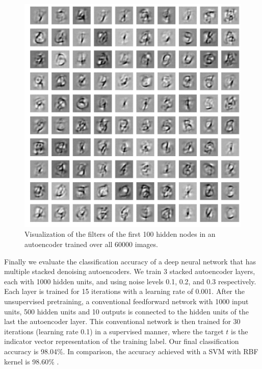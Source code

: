 \documentclass[conference]{IEEEtran}
\begin{document}
\begin{figure}[h]
\centering
\includegraphics[width=0.8\linewidth]{experiment3_1.png}
\caption{Visualization of the filters of the first 100 hidden nodes in an autoencoder trained over all 60000 images.}
\label{fig:experiment3_1}
\end{figure}

Finally we evaluate the classification accuracy of a deep neural network that has multiple stacked denoising autoencoders. We train 3 stacked autoencoder layers, each with 1000 hidden units, and using noise levels 0.1, 0.2, and 0.3 respectively. Each layer is trained for 15 iterations with a learning rate of 0.001. After the unsupervised pretraining, a conventional feedforward network with 1000 input units, 500 hidden units and 10 outputs is connected to the hidden units of the last the autoencoder layer. This conventional network is then trained for 30 iterations (learning rate 0.1) in a supervised manner, where the target $t$ is the indicator vector representation of the training label. Our final classification accuracy is 98.04\%. In comparison, the accuracy achieved with a SVM with RBF kernel is 98.60\% \cite{vincent2010stacked}. 
\end{document}
